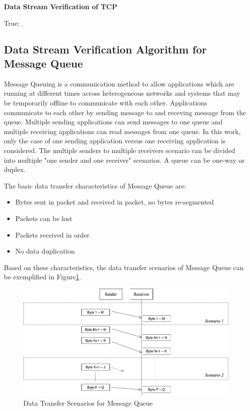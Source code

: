 \begin{algorithm}[H]
\DontPrintSemicolon
\caption{{\bf Data Stream Verification of TCP} \label{dataAlg2}}
\;
 \KwRet True;\;
\end{algorithm} 



\subsection{Data Stream Verification Algorithm for Message Queue}
Message Queuing is a communication method to allow applications which are running at different times across heterogeneous networks and systems that may be temporarily offline to communicate with each other. Applications communicate to each other by sending message to and receving message from the queue. Multiple sending applications can send messages to one queue and multiple receiving applications can read messages from one queue.\cite{redkar2004pro} In this work, only the case of one sending application versus one receiving application is considered. The multiple senders to multiple receivers scenario can be divided into multiple "one sender and one receiver" scenarios. A queue can be one-way or duplex.

The basic data transfer characteristics of Message Queue are:
\begin{itemize}
  \item Bytes sent in packet and received in packet, no bytes re-segmented
  \item Packets can be lost
  \item Packets received in order
  \item No data duplication
\end{itemize}
Based on these characteristics, the data transfer scenarios of Message Queue can be exemplified in Figure\ref{msmq}.
\begin{figure}[H]
\centerline{\includegraphics[scale=0.4]{Figures/msmq}}
\caption{Data Transfer Scenarios for Message Queue}
\label{msmq}
\end{figure}

